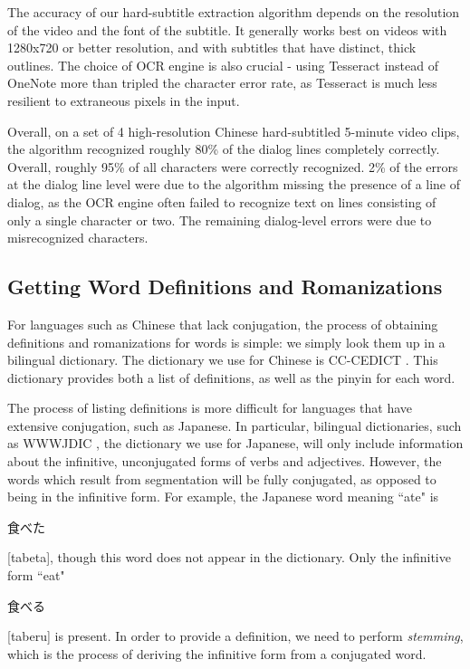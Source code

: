 \documentclass{sigchi}
\begin{document}
The accuracy of our hard-subtitle extraction algorithm depends on the resolution of the video and
the font of the subtitle. It generally works best on videos with 1280x720 or better resolution, and with subtitles that have distinct, thick outlines. The choice of OCR engine is also crucial - using Tesseract instead of OneNote more than tripled the character error rate,
as Tesseract is much less resilient to extraneous pixels in the input.

Overall, on a set of 4 high-resolution Chinese hard-subtitled 5-minute video clips, the algorithm recognized roughly 80\% of the dialog lines completely correctly. Overall, roughly 95\% of all characters were correctly recognized. 2\% of the errors at the dialog line level were due to the algorithm missing the presence of a line of dialog, as the OCR engine often failed to recognize text on lines consisting of only a single character or two. The remaining dialog-level errors were due to misrecognized characters.


\subsection{Getting Word Definitions and Romanizations}

For languages such as Chinese that lack conjugation, the process of obtaining definitions and romanizations for words is simple: we simply look them up in a bilingual dictionary. The dictionary we use for Chinese is CC-CEDICT \cite{mdbg}. This dictionary provides both a list of definitions, as well as the pinyin for each word.

The process of listing definitions is more difficult for languages that have extensive conjugation, such as Japanese. In particular, bilingual dictionaries, such as WWWJDIC \cite{wwwjdic}, the dictionary we use for Japanese, will only include information about the infinitive, unconjugated forms of verbs and adjectives. However, the words which result from segmentation will be fully conjugated, as opposed to being in the infinitive form. For example, the Japanese word meaning ``ate" is \begin{CJK}{UTF8}{min}食べた\end{CJK} [tabeta], though this word does not appear in the dictionary. Only the infinitive form ``eat" \begin{CJK}{UTF8}{min}食べる\end{CJK} [taberu] is present. In order to provide a definition, we need to perform \emph{stemming}, which is the process of deriving the infinitive form from a conjugated word.
\end{document}
